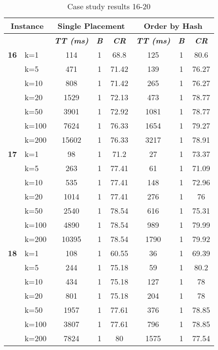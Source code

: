     \begin{table}[htbp]
    \caption{Case study results 16-20}
    \centering
    \begin{tabular}{|l|l|c|c|c|c|c|c|}
    \hline
    \multicolumn{ 2}{|c|}{\textbf{Instance}} & \multicolumn{ 3}{c|}{\textbf{Single Placement}} & \multicolumn{ 3}{c|}{\textbf{Order by Hash}} \\ \hline
    \multicolumn{ 2}{|l|}{} & \textbf{\textit{TT (ms)}} & \textbf{\textit{B}} & \textbf{\textit{CR}} & \textbf{\textit{TT (ms)}} & \textbf{\textit{B}} & \textbf{\textit{CR}} \\ \hline
    \multicolumn{1}{|r|}{\textbf{16}} & k=1 & 114 & 1 & 68.8 & 125 & 1 & 80.6 \\ 
     & k=5 & 471 & 1 & 71.42 & 139 & 1 & 76.27 \\ 
     & k=10 & 808 & 1 & 71.42 & 265 & 1 & 76.27 \\ 
     & k=20 & 1529 & 1 & 72.13 & 473 & 1 & 78.77 \\ 
     & k=50 & 3901 & 1 & 72.92 & 1081 & 1 & 78.77 \\ 
     & k=100 & 7624 & 1 & 76.33 & 1654 & 1 & 79.27 \\ 
     & k=200 & 15602 & 1 & 76.33 & 3217 & 1 & 78.91 \\ \hline
    \multicolumn{1}{|r|}{\textbf{17}} & k=1 & 98 & 1 & 71.2 & 27 & 1 & 73.37 \\ 
     & k=5 & 263 & 1 & 77.41 & 61 & 1 & 71.09 \\ 
     & k=10 & 535 & 1 & 77.41 & 148 & 1 & 72.96 \\ 
     & k=20 & 1014 & 1 & 77.41 & 276 & 1 & 76 \\ 
     & k=50 & 2540 & 1 & 78.54 & 616 & 1 & 75.31 \\ 
     & k=100 & 4890 & 1 & 78.54 & 989 & 1 & 79.99 \\ 
     & k=200 & 10395 & 1 & 78.54 & 1790 & 1 & 79.92 \\ \hline
    \multicolumn{1}{|r|}{\textbf{18}} & k=1 & 108 & 1 & 60.55 & 36 & 1 & 69.39 \\ 
     & k=5 & 244 & 1 & 75.18 & 59 & 1 & 80.2 \\ 
     & k=10 & 434 & 1 & 75.18 & 127 & 1 & 78 \\ 
     & k=20 & 801 & 1 & 75.18 & 204 & 1 & 78 \\ 
     & k=50 & 1957 & 1 & 77.61 & 376 & 1 & 78.85 \\ 
     & k=100 & 3807 & 1 & 77.61 & 796 & 1 & 78.85 \\ 
     & k=200 & 7824 & 1 & 80 & 1575 & 1 & 77.54 \\ \hline

\end{tabular}
\end{table}
